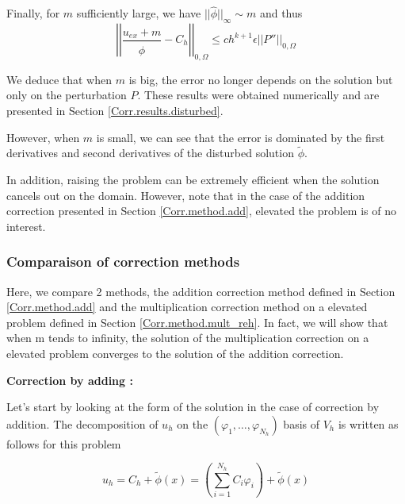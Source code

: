 Finally, for $m$ sufficiently large, we have $||\hat{\phi}||_\infty\sim m$ and thus
\begin{equation*}
	\left|\left|\frac{u_{ex}+m}{\hat{\phi}}-C_h\right|\right|_{0,\Omega}\le ch^{k+1}\epsilon\left|\left|P''\right|\right|_{0,\Omega}
\end{equation*}

We deduce that when $m$ is big, the error no longer depends on the solution but only on the perturbation $P$. These results were obtained numerically and are presented in Section \ref{Corr.results.disturbed}.

However, when $m$ is small, we can see that the error is dominated by the first derivatives and second derivatives of the disturbed solution $\tilde{\phi}$.

\begin{Rem}
	In addition, raising the problem can be extremely efficient when the solution cancels out on the domain. However, note that in the case of the addition correction presented in Section \ref{Corr.method.add}, elevated the problem is of no interest.
\end{Rem}

\subsubsection{Comparaison of correction methods} \label{Corr.theo_results.comp_add_reh}

Here, we compare 2 methods, the addition correction method defined in Section \ref{Corr.method.add} and the multiplication correction method on a elevated problem defined in Section \ref{Corr.method.mult_reh}. In fact, we will show that when m tends to infinity, the solution of the multiplication correction on a elevated problem converges to the solution of the addition correction.

\textbf{Correction by adding :}

Let's start by looking at the form of the solution in the case of correction by addition. The decomposition of $u_h$ on the $(\varphi_1,\dots,\varphi_{N_h})$ basis of $V_h$ is written as follows for this problem

\begin{equation}
	u_h=C_h+\tilde{\phi}(x)=\left(\sum_{i=1}^{N_h}C_i\varphi_i\right)+\tilde{\phi}(x) \label{decomp_pbc2}
\end{equation}

